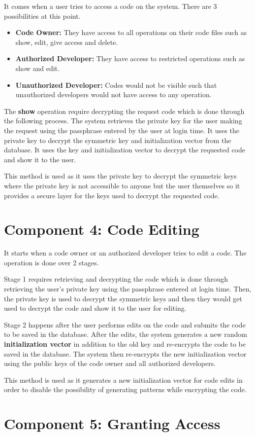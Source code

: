 It comes when a user tries to access a code on the system. There are 3 possibilities at this point.

\begin{itemize}
	\item \textbf{Code Owner:} They have access to all operations on their code files such as show, edit, give access and delete.
	\item \textbf{Authorized Developer:} They have access to restricted operations such as show and edit.
	\item \textbf{Unauthorized Developer:} Codes would not be visible such that unauthorized developers would not have access to any operation.
\end{itemize}

The \textbf{show} operation require decrypting the request code which is done through the following process. The system retrieves the private key for the user making the request using the passphrase entered by the user at login time. It uses the private key to decrypt the symmetric key and initialization vector from the database. It uses the key and initialization vector to decrypt the requested code and show it to the user.

This method is used as it uses the private key to decrypt the symmetric keys where the private key is not accessible to anyone but the user themselves so it provides a secure layer for the keys used to decrypt the requested code.

\section{Component 4: Code Editing}

It starts when a code owner or an authorized developer tries to edit a code. The operation is done over 2 stages.

Stage 1 requires retrieving and decrypting the code which is done through retrieving the user's private key using the passphrase entered at login time. Then, the private key is used to decrypt the symmetric keys and then they would get used to decrypt the code and show it to the user for editing.

Stage 2 happens after the user performs edits on the code and submits the code to be saved in the database. After the edits, the system generates a new random \textbf{initialization vector} in addition to the old key and re-encrypts the code to be saved in the database. The system then re-encrypts the new initialization vector using the public keys of the code owner and all authorized developers.

This method is used as it generates a new initialization vector for code edits in order to disable the possibility of generating patterns while encrypting the code.

\section{Component 5: Granting Access}